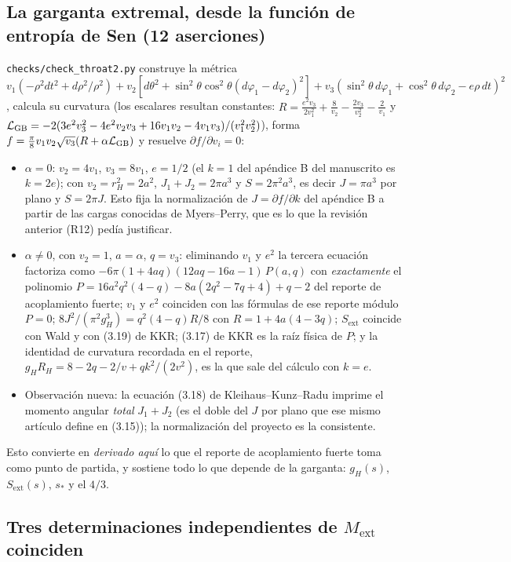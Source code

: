 \documentclass[10pt,a4paper]{article}
\newcommand{\code}[1]{\texttt{#1}}
\newcommand{\ext}{\mathrm{ext}}
\begin{document}
\subsection{La garganta extremal, desde la función de entropía de Sen (12 aserciones)}

\code{checks/check\_throat2.py} construye la métrica
$v_1(-\rho^2dt^2+d\rho^2/\rho^2)+v_2[d\theta^2+\sin^2\!\theta\cos^2\!\theta(d\varphi_1-d\varphi_2)^2]
+v_3(\sin^2\!\theta\,d\varphi_1+\cos^2\!\theta\,d\varphi_2-e\rho\,dt)^2$, calcula su curvatura
(los escalares resultan constantes: $R=\frac{e^2v_3}{2v_1^2}+\frac8{v_2}-\frac{2v_3}{v_2^2}-\frac2{v_1}$ y
$\mathcal L_{\rm GB}=-2(3e^2v_3^2-4e^2v_2v_3+16v_1v_2-4v_1v_3)/(v_1^2v_2^2)$), forma
$f=\frac\pi8v_1v_2\sqrt{v_3}(R+\alpha\mathcal L_{\rm GB})$ y resuelve $\partial f/\partial v_i=0$:
\begin{itemize}
\item $\alpha=0$: $v_2=4v_1$, $v_3=8v_1$, $e=1/2$ (el $k=1$ del apéndice B del manuscrito es $k=2e$);
 con $v_2=r_H^2=2a^2$, $J_1+J_2=2\pi a^3$ y $S=2\pi^2a^3$, es decir $J=\pi a^3$ por plano y
 $S=2\pi J$. Esto fija la normalización de $J=\partial f/\partial k$ del apéndice B a partir de las
 cargas conocidas de Myers--Perry, que es lo que la revisión anterior (R12) pedía justificar.
\item $\alpha\ne0$, con $v_2=1$, $a=\alpha$, $q=v_3$: eliminando $v_1$ y $e^2$ la tercera
 ecuación factoriza como $-6\pi(1+4aq)(12aq-16a-1)\,P(a,q)$ con \emph{exactamente} el polinomio
 $P=16a^2q^2(4-q)-8a(2q^2-7q+4)+q-2$ del reporte de acoplamiento fuerte; $v_1$ y $e^2$ coinciden
 con las fórmulas de ese reporte módulo $P=0$; $8J^2/(\pi^2g_H^3)=q^2(4-q)R/8$ con $R=1+4a(4-3q)$;
 $S_\ext$ coincide con Wald y con (3.19) de KKR; (3.17) de KKR es la raíz física de $P$;
 y la identidad de curvatura recordada en el reporte, $g_HR_H=8-2q-2/v+qk^2/(2v^2)$, es la que
 sale del cálculo con $k=e$.
\item Observación nueva: la ecuación (3.18) de Kleihaus--Kunz--Radu imprime el momento angular
 \emph{total} $J_1+J_2$ (es el doble del $J$ por plano que ese mismo artículo define en (3.15)); la
 normalización del proyecto es la consistente.
\end{itemize}
Esto convierte en \emph{derivado aquí} lo que el reporte de acoplamiento fuerte toma como punto de
partida, y sostiene todo lo que depende de la garganta: $g_H(s)$, $S_\ext(s)$, $s_*$ y el $4/3$.

\subsection{Tres determinaciones independientes de $M_\ext$ coinciden}
\label{sec:tres}
\end{document}
